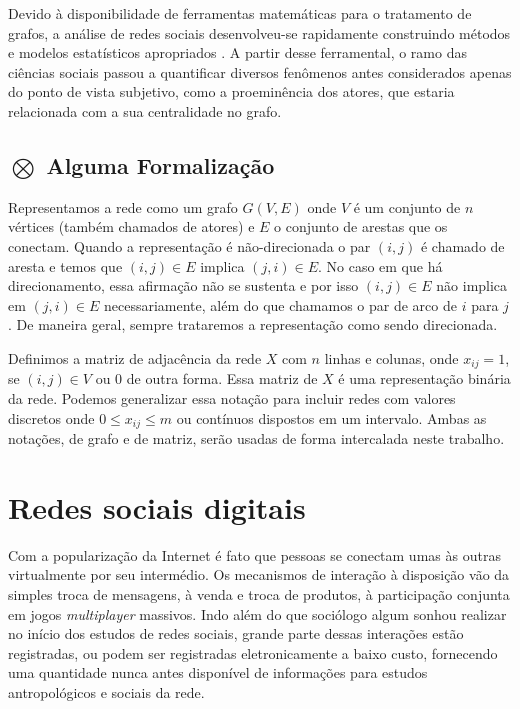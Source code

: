 \documentclass{article}
\begin{document}
Devido à disponibilidade de ferramentas matemáticas para o tratamento de grafos,
a análise de redes sociais desenvolveu-se rapidamente construindo métodos e
modelos estatísticos apropriados \cite{Butts2009}. A partir desse ferramental, o
ramo das ciências sociais passou a quantificar diversos fenômenos antes
considerados apenas do ponto de vista subjetivo, como a proeminência dos atores,
que estaria relacionada com a sua centralidade no grafo.

\subsection{$\bigotimes$ Alguma Formalização}

Representamos a rede como um grafo $G(V,E)$ onde $V$ é um conjunto de $n$
vértices (também chamados de atores) e $E$ o conjunto de arestas que os conectam.
Quando a representação é não-direcionada o par $(i,j)$ é chamado de aresta e
temos que $(i,j) \in E$ implica $(j,i) \in E$. No caso em que há direcionamento,
essa afirmação não se sustenta e por isso $(i,j) \in E$ não implica em $(j,i) \in
E$ necessariamente, além do que chamamos o par de arco de $i$ para $j$. De
maneira geral, sempre trataremos a representação como sendo direcionada.

Definimos a matriz de adjacência da rede $X$ com $n$ linhas e colunas, onde
$x_{ij} = 1$, se $(i,j) \in V$ ou 0 de outra forma. Essa matriz de $X$ é uma
representação binária da rede. Podemos generalizar essa notação para incluir
redes com valores discretos onde $0 \leq x_{ij} \leq m$ ou contínuos dispostos em
um intervalo. Ambas as notações, de grafo e de matriz, serão usadas de forma
intercalada neste trabalho.

\section{Redes sociais digitais}

Com a popularização da Internet é fato que pessoas se conectam umas às outras
virtualmente por seu intermédio. Os mecanismos de interação à disposição vão da
simples troca de mensagens, à venda e troca de produtos, à participação conjunta
em jogos \textit{multiplayer} massivos. Indo além do que sociólogo algum sonhou
realizar no início dos estudos de redes sociais, grande parte dessas interações
estão registradas, ou podem ser registradas eletronicamente a baixo custo,
fornecendo uma quantidade nunca antes disponível de informações para
estudos antropológicos e sociais da rede.
\end{document}
